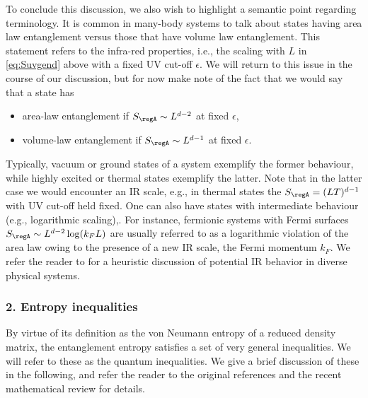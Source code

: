 \documentclass[12pt,openany]{book}
\begin{document}
To conclude this discussion, we also wish to highlight a semantic point regarding terminology. It is common in many-body systems to talk about states having area law entanglement versus those that have volume law entanglement. This statement refers to the infra-red properties, i.e., the scaling with $L$ in \eqref{eq:Suvgend} above with a fixed UV cut-off $\epsilon$. We will return to this issue in the course of our discussion, but for now make note of the fact that we would say that a state has
\begin{itemize}
\item area-law entanglement if $S_\regA \sim L^{d-2}$ at fixed $\epsilon$,
\item volume-law entanglement if $S_\regA \sim L^{d-1}$ at fixed $\epsilon$.
\end{itemize}
Typically, vacuum or ground states of a system exemplify the former behaviour, while highly excited or thermal states exemplify the latter. Note that in the latter case we would encounter an IR scale, e.g., in thermal states the $S_\regA = (LT)^{d-1}$ with UV cut-off held fixed. One can also have states with intermediate  behaviour (e.g., logarithmic scaling),. For instance, fermionic systems with Fermi surfaces $S_\regA \sim L^{d-2} \log (k_F L) $  are usually referred to as a logarithmic violation of the area law owing to the presence of a new IR scale, the Fermi momentum $k_F$. We refer the reader to \cite{Swingle:2011np} for a heuristic discussion of potential IR behavior in diverse physical systems.

\subsubsection{2. Entropy inequalities}
\label{sec:eeineq}

By virtue of its definition as the von Neumann entropy of a reduced density matrix, the entanglement entropy satisfies a set of very general inequalities. We will refer to these as the quantum inequalities. We give a brief discussion of these in the following, and refer the reader to the original references \cite{Araki:1970ba,Lieb:1973lr,Lieb:1973cp}  and the recent mathematical review \cite{Carlen:2010aa} for  details.
\end{document}

